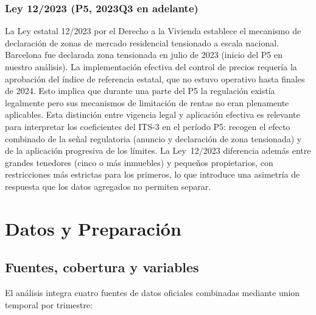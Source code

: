 \documentclass[10pt,a4paper,twocolumn]{article}
\begin{document}
\subsubsection*{Ley 12/2023 (P5, 2023Q3 en adelante)}

La Ley estatal 12/2023 por el Derecho a la Vivienda establece el mecanismo de
declaración de zonas de mercado residencial tensionado a escala nacional. Barcelona
fue declarada zona tensionada en julio de 2023 (inicio del P5 en nuestro análisis).
La implementación efectiva del control de precios requería la aprobación del índice
de referencia estatal, que no estuvo operativo hasta finales de 2024. Esto implica
que durante una parte del P5 la regulación existía legalmente pero sus mecanismos de
limitación de rentas no eran plenamente aplicables. Esta distinción entre vigencia
legal y aplicación efectiva es relevante para interpretar los coeficientes del ITS-3
en el período P5: recogen el efecto combinado de la señal regulatoria (anuncio y
declaración de zona tensionada) y de la aplicación progresiva de los límites.
La Ley~12/2023 diferencia además entre grandes tenedores (cinco o más inmuebles)
y pequeños propietarios, con restricciones más estrictas para los primeros, lo que
introduce una asimetría de respuesta que los datos agregados no permiten separar.

\section{Datos y Preparación}
\label{sec:datos}

\subsection{Fuentes, cobertura y variables}

El análisis integra cuatro fuentes de datos oficiales
\citep{incasol2025,ine2025ipc,bde2025euribor,idescat2025ist}
combinadas mediante union temporal por trimestre:
\end{document}

